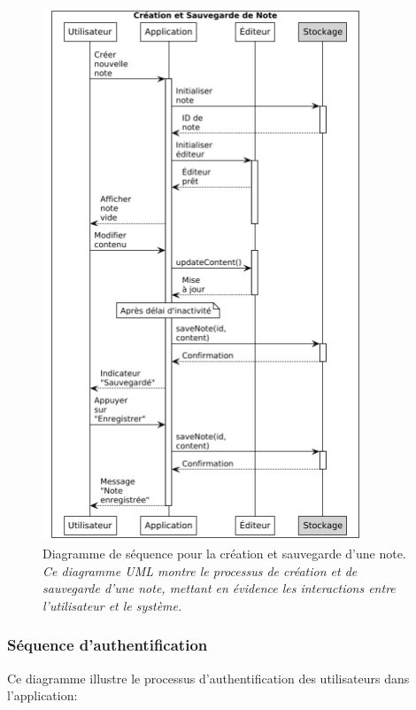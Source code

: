         \begin{figure}[htbp]
        \centering
        \includegraphics[width=0.85\textwidth]{assets/docs/voicenotion_sequence_save.png}
        \caption{Diagramme de séquence pour la création et sauvegarde d'une note. \newline\textit{Ce diagramme UML montre le processus de création et de sauvegarde d'une note, mettant en évidence les interactions entre l'utilisateur et le système.}}
        \label{fig:sequence_save_note}
    \end{figure}
    
    \subsubsection{Séquence d'authentification}
    
    Ce diagramme illustre le processus d'authentification des utilisateurs dans l'application:
    
